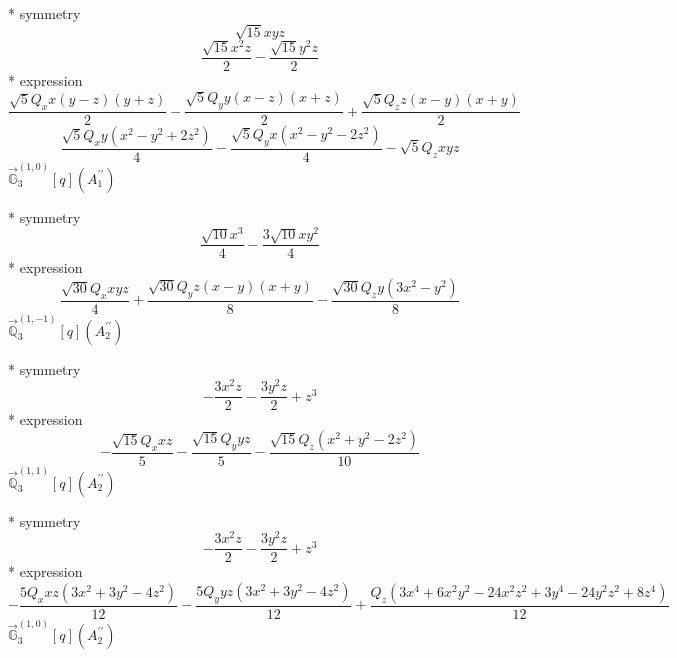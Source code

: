 \documentclass[fleqn,8pt]{jsarticle}
\begin{document}
\noindent\quad ** symmetry
\begin{dmath*}
\sqrt{15} x y z
\end{dmath*}
\begin{dmath*}
\frac{\sqrt{15} x^{2} z}{2} - \frac{\sqrt{15} y^{2} z}{2}
\end{dmath*}
\noindent\quad ** expression
\begin{dmath*}
\frac{\sqrt{5} Q_{x} x \left(y - z\right) \left(y + z\right)}{2} - \frac{\sqrt{5} Q_{y} y \left(x - z\right) \left(x + z\right)}{2} + \frac{\sqrt{5} Q_{z} z \left(x - y\right) \left(x + y\right)}{2}
\end{dmath*}
\begin{dmath*}
\frac{\sqrt{5} Q_{x} y \left(x^{2} - y^{2} + 2 z^{2}\right)}{4} - \frac{\sqrt{5} Q_{y} x \left(x^{2} - y^{2} - 2 z^{2}\right)}{4} - \sqrt{5} Q_{z} x y z
\end{dmath*}
\noindent\quad $\vec{\mathbb{G}}_{3}^{(1,0)}[q](A_{1}^{\prime\prime})$

\noindent\quad ** symmetry
\begin{dmath*}
\frac{\sqrt{10} x^{3}}{4} - \frac{3 \sqrt{10} x y^{2}}{4}
\end{dmath*}
\noindent\quad ** expression
\begin{dmath*}
\frac{\sqrt{30} Q_{x} x y z}{4} + \frac{\sqrt{30} Q_{y} z \left(x - y\right) \left(x + y\right)}{8} - \frac{\sqrt{30} Q_{z} y \left(3 x^{2} - y^{2}\right)}{8}
\end{dmath*}
\noindent\quad $\vec{\mathbb{Q}}_{3}^{(1,-1)}[q](A_{2}^{\prime\prime})$

\noindent\quad ** symmetry
\begin{dmath*}
- \frac{3 x^{2} z}{2} - \frac{3 y^{2} z}{2} + z^{3}
\end{dmath*}
\noindent\quad ** expression
\begin{dmath*}
- \frac{\sqrt{15} Q_{x} x z}{5} - \frac{\sqrt{15} Q_{y} y z}{5} - \frac{\sqrt{15} Q_{z} \left(x^{2} + y^{2} - 2 z^{2}\right)}{10}
\end{dmath*}
\noindent\quad $\vec{\mathbb{Q}}_{3}^{(1,1)}[q](A_{2}^{\prime\prime})$

\noindent\quad ** symmetry
\begin{dmath*}
- \frac{3 x^{2} z}{2} - \frac{3 y^{2} z}{2} + z^{3}
\end{dmath*}
\noindent\quad ** expression
\begin{dmath*}
- \frac{5 Q_{x} x z \left(3 x^{2} + 3 y^{2} - 4 z^{2}\right)}{12} - \frac{5 Q_{y} y z \left(3 x^{2} + 3 y^{2} - 4 z^{2}\right)}{12} + \frac{Q_{z} \left(3 x^{4} + 6 x^{2} y^{2} - 24 x^{2} z^{2} + 3 y^{4} - 24 y^{2} z^{2} + 8 z^{4}\right)}{12}
\end{dmath*}
\noindent\quad $\vec{\mathbb{G}}_{3}^{(1,0)}[q](A_{2}^{\prime\prime})$
\end{document}
